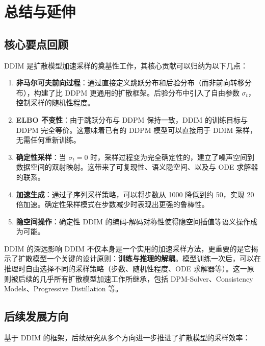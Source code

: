 \section{总结与延伸}

\subsection{核心要点回顾}

DDIM 是扩散模型加速采样的奠基性工作，其核心贡献可以归纳为以下几点：

\begin{enumerate}
    \item \textbf{非马尔可夫前向过程}：通过直接定义跳跃分布和后验分布（而非前向转移分布），构建了比 DDPM 更通用的扩散框架。后验分布中引入了自由参数 $\sigma_t$，控制采样的随机性程度。

    \item \textbf{ELBO 不变性}：由于跳跃分布与 DDPM 保持一致，DDIM 的训练目标与 DDPM 完全等价。这意味着已有的 DDPM 模型可以直接用于 DDIM 采样，无需任何重新训练。

    \item \textbf{确定性采样}：当 $\sigma_t = 0$ 时，采样过程变为完全确定性的，建立了噪声空间到数据空间的双射映射。这带来了可复现性、语义隐空间、以及与 ODE 求解器的联系。

    \item \textbf{加速生成}：通过子序列采样策略，可以将步数从 1000 降低到约 50，实现 20 倍加速。确定性采样模式在步数减少时表现出更强的鲁棒性。

    \item \textbf{隐空间操作}：确定性 DDIM 的编码-解码对称性使得隐空间插值等语义操作成为可能。
\end{enumerate}

\begin{importantbox}{DDIM 的深远影响}
DDIM 不仅本身是一个实用的加速采样方法，更重要的是它揭示了扩散模型一个关键的设计原则：\textbf{训练与推理的解耦}。模型训练一次后，可以在推理时自由选择不同的采样策略（步数、随机性程度、ODE 求解器等）。这一原则被后续的几乎所有扩散模型加速工作所继承，包括 DPM-Solver、Consistency Models、Progressive Distillation 等。
\end{importantbox}

\subsection{后续发展方向}

基于 DDIM 的框架，后续研究从多个方向进一步推进了扩散模型的采样效率：


